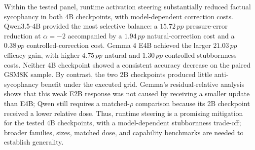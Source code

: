 \documentclass[11pt]{article}
\newcommand{\pp}{\,pp}
\begin{document}
Within the tested panel, runtime activation steering substantially reduced
factual sycophancy in both 4B checkpoints, with model-dependent correction
costs. Qwen3.5-4B provided the most selective balance: a $15.72\pp$
pressure-error reduction at $\alpha=-2$ accompanied by a
$1.94\pp$ natural-correction cost and a $0.38\pp$ controlled-correction cost.
Gemma 4 E4B achieved the larger $21.03\pp$ efficacy gain, with higher
$4.75\pp$ natural and $1.30\pp$ controlled stubbornness costs.
Neither 4B checkpoint showed a consistent accuracy decrease on the paired
GSM8K sample. By contrast, the two 2B checkpoints produced little
anti-sycophancy benefit under the executed grid. Gemma's residual-relative
analysis shows that this weak E2B response was not caused by receiving a smaller
update than E4B; Qwen still requires a matched-$\rho$ comparison because its 2B
checkpoint received a lower relative dose. Thus, runtime steering is a
promising mitigation for the tested 4B checkpoints, with a model-dependent
stubbornness trade-off; broader families, sizes, matched dose, and capability
benchmarks are needed to establish generality.

\clearpage
\begin{landscape}

\end{landscape}
\clearpage



\end{document}
